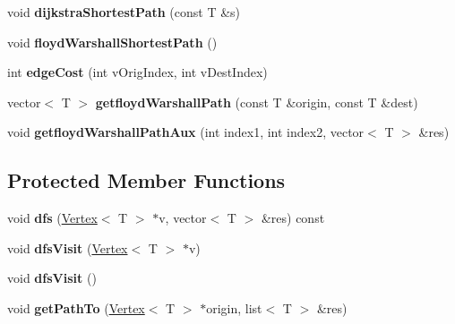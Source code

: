 \begin{DoxyCompactItemize}
\item 
\hypertarget{class_graph_a445a38cf4045797198eae2b818b602de}{}void {\bfseries dijkstra\+Shortest\+Path} (const T \&s)\label{class_graph_a445a38cf4045797198eae2b818b602de}

\item 
\hypertarget{class_graph_ae5161f4408bf1ead2b29d19d67fb04ee}{}void {\bfseries floyd\+Warshall\+Shortest\+Path} ()\label{class_graph_ae5161f4408bf1ead2b29d19d67fb04ee}

\item 
\hypertarget{class_graph_a7e137f1ef838395ac1044a944fa54448}{}int {\bfseries edge\+Cost} (int v\+Orig\+Index, int v\+Dest\+Index)\label{class_graph_a7e137f1ef838395ac1044a944fa54448}

\item 
\hypertarget{class_graph_ab23d1dae92a7f2b29dcb91a94336674c}{}vector$<$ T $>$ {\bfseries getfloyd\+Warshall\+Path} (const T \&origin, const T \&dest)\label{class_graph_ab23d1dae92a7f2b29dcb91a94336674c}

\item 
\hypertarget{class_graph_aad1eda4beb8425d03ed1f3b8af397563}{}void {\bfseries getfloyd\+Warshall\+Path\+Aux} (int index1, int index2, vector$<$ T $>$ \&res)\label{class_graph_aad1eda4beb8425d03ed1f3b8af397563}

\end{DoxyCompactItemize}
\subsection*{Protected Member Functions}
\begin{DoxyCompactItemize}
\item 
\hypertarget{class_graph_a3a36cb674c974bac7181095509a73ee7}{}void {\bfseries dfs} (\hyperlink{class_vertex}{Vertex}$<$ T $>$ $\ast$v, vector$<$ T $>$ \&res) const \label{class_graph_a3a36cb674c974bac7181095509a73ee7}

\item 
\hypertarget{class_graph_a167172d4ecb3f4998caaaf370724b536}{}void {\bfseries dfs\+Visit} (\hyperlink{class_vertex}{Vertex}$<$ T $>$ $\ast$v)\label{class_graph_a167172d4ecb3f4998caaaf370724b536}

\item 
\hypertarget{class_graph_a4d5abd78dd24ea71dbf50e1b0284d4b3}{}void {\bfseries dfs\+Visit} ()\label{class_graph_a4d5abd78dd24ea71dbf50e1b0284d4b3}

\item 
\hypertarget{class_graph_ac08257ce8a96a8b4e44f1818e5eb8cf9}{}void {\bfseries get\+Path\+To} (\hyperlink{class_vertex}{Vertex}$<$ T $>$ $\ast$origin, list$<$ T $>$ \&res)\label{class_graph_ac08257ce8a96a8b4e44f1818e5eb8cf9}

\end{DoxyCompactItemize}
